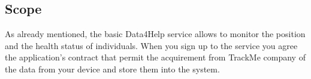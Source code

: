 \subsection{Scope}
As already mentioned, the basic Data4Help service allows to monitor the position and the health status of individuals. When you sign up to the service you agree the application's contract that permit the acquirement from TrackMe company of the data from your device and store them into the system.